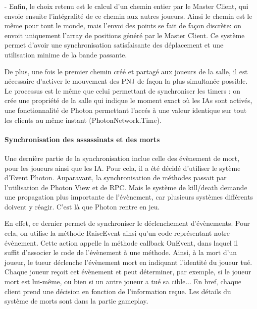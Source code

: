             - Enfin, le choix retenu est le calcul d'un chemin entier par le Master Client, qui envoie ensuite l'intégralité de ce chemin aux autres joueurs.
            Ainsi le chemin est le même pour tout le monde, mais l'envoi des points se fait de façon discrète: on envoit uniquement l'array de positions généré
            par le Master Client. Ce système permet d'avoir une synchronisation satisfaisante des déplacement et une utilisation minime de la bande passante.

            De plus, une fois le premier chemin créé et partagé aux joueurs de la salle, il est nécessaire d'activer le mouvement des PNJ de façon la plus simultanée possible.
            Le processus est le même que celui permettant de synchroniser les timers : on crée une propriété de la salle qui indique le moment exact où
            les IAs sont activés, une fonctionnalité de Photon permettant l'accés à une valeur identique sur tout les clients au même instant (PhotonNetwork.Time).


        \paragraph{Synchronisation des assassinats et des morts}

            Une dernière partie de la synchronisation inclue celle des évènement de mort, pour les joueurs ainsi
            que les IA. Pour cela, il a été décidé d'utiliser le sytème d'Event Photon. Auparavant, la synchronisation de méthodes
            passait par l'utilisation de Photon View et de RPC. Mais le système de kill/death demande une propagation plus importante
            de l'évènement, car plusieurs systèmes différents doivent y réagir. C'est là que Photon rentre en jeu.

            En effet, ce dernier permet de synchroniser le déclenchement d'évènements. Pour cela, on utilise la méthode RaiseEvent ainsi
            qu'un code représentant notre évènement. Cette action appelle la méthode callback OnEvent, dans laquel il suffit d'associer le
            code de l'évènement à une méthode. Ainsi, à la mort d'un joueur, le tueur déclenche l'évènement mort en indiquant l'identité du
            joueur tué. Chaque joueur reçoit cet évènement et peut déterminer, par exemple, si le joueur mort est lui-même, ou bien si un
            autre joueur a tué sa cible... En bref, chaque client prend une décision en fonction de l'information reçue.
            Les détails du système de morts sont dans la partie gameplay.

